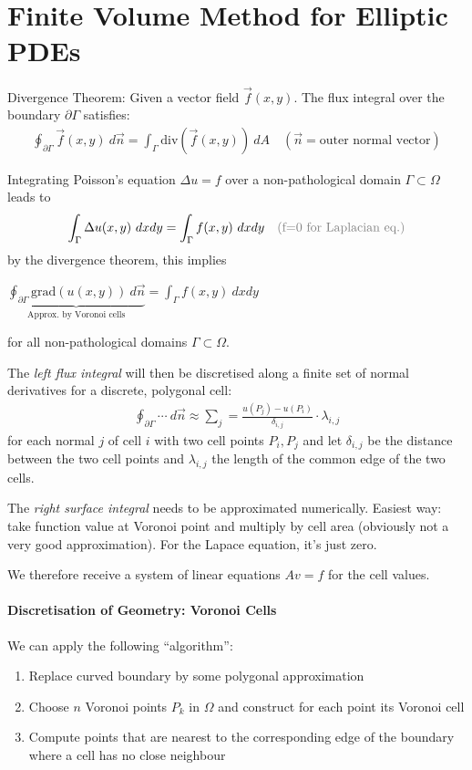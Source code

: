 \section{Finite Volume Method for Elliptic PDEs}
\begin{addmargin}[1em]{0em}
    {\color{teal}
        Divergence Theorem: Given a vector field $\vec{f}(x,y)$.
        The flux integral over the boundary $\partial\Gamma$ satisfies:
        \begin{align*}
            \oint_{\partial\Gamma}\vec{f}(x,y)\ d\vec{n} = \int_\Gamma \mathrm{div}(\vec{f}(x,y))\ dA
            \quad(\vec{n} = \text{outer normal vector})
        \end{align*}
    }
\end{addmargin}

Integrating Poisson's equation $\Delta u = f$ over a non-pathological domain $\Gamma\subset\Omega$ leads to
\begin{align*}
    \int_\Gamma \Delta u(x,y)\ dxdy = \int_\Gamma f(x,y)\ dxdy\quad{\color{gray}\text{(f=0 for Laplacian eq.)}}
\end{align*}
by the divergence theorem, this implies

\colorbox{shadecolor}{$
    \displaystyle
    \underbrace{\oint_{\partial\Gamma}\mathrm{grad}(u(x,y))\ d\vec{n}}_\text{Approx. by Voronoi cells}
    = \int_\Gamma f(x,y)\ dxdy
$}

for all non-pathological domains $\Gamma\subset\Omega$.

The \emph{left flux integral} will then be discretised along a finite set of normal derivatives
for a discrete, polygonal cell:
\begin{align*}
    \oint_{\partial\Gamma}\cdots\ d\vec{n} \approx \sum_j = \frac{u(P_j) - u(P_i)}{\delta_{i,j}}\cdot \lambda_{i,j}
\end{align*}
for each normal $j$ of cell $i$ with two cell points $P_i,P_j$ and let
$\delta_{i,j}$ be the distance between the two cell points
and $\lambda_{i,j}$ the length of the common edge of the two cells.

The \emph{right surface integral} needs to be approximated numerically.
Easiest way: take function value at Voronoi point and multiply by cell area
(obviously not a very good approximation). For the Lapace equation, it's just zero.

We therefore receive a system of linear equations $Av=f$ for the cell values.

\paragraph{Discretisation of Geometry: Voronoi Cells}
We can apply the following ``algorithm'':
\begin{enumerate}
    \item Replace curved boundary by some polygonal approximation
    \item Choose $n$ Voronoi points $P_k$ in $\Omega$ and construct for each point its Voronoi cell
    \item Compute points that are nearest to the corresponding edge of the boundary where a cell has no close neighbour
\end{enumerate}

